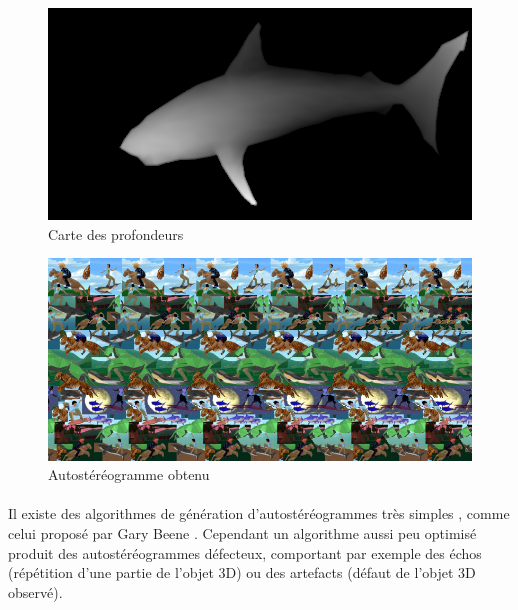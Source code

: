 \begin{figure}[h!]
		\centering
		\includegraphics[scale=0.4]{carteProfondeur.png}
		\caption{\label{fig:carteProfondeur} Carte des profondeurs \protect \footnotemark }
\end{figure}
\begin{figure}[h]
		\centering
		\includegraphics[scale=0.5]{autostereog.png}
		\caption{\label{fig:autostereogramme} Autostéréogramme obtenu \protect \footnotemark }
\end{figure}

\paragraph{}
Il existe des algorithmes de génération d’autostéréogrammes très simples , comme celui proposé par Gary Beene \cite{garybeene}. Cependant un algorithme aussi peu optimisé produit des autostéréogrammes défecteux, comportant par exemple des échos (répétition d'une partie de l'objet 3D) ou des artefacts (défaut de l'objet 3D observé).

